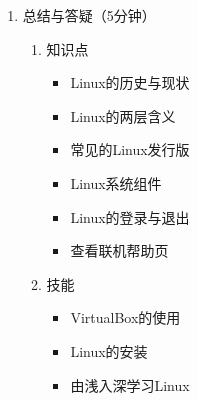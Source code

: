 \documentclass{TIJMUjiaoanLL}
\begin{document}
\begin{enumerate}

  \item 总结与答疑（5分钟）
    \begin{enumerate}
      \item 知识点
	\begin{itemize}
	  \item Linux的历史与现状
	  \item Linux的两层含义
	  \item 常见的Linux发行版
	  \item Linux系统组件
	  \item Linux的登录与退出
	  \item 查看联机帮助页
	\end{itemize}
      \item 技能
	\begin{itemize}
	  \item VirtualBox的使用
	  \item Linux的安装
	  \item 由浅入深学习Linux
	\end{itemize}
    \end{enumerate}
\end{enumerate}

\otherTail
\end{document}
